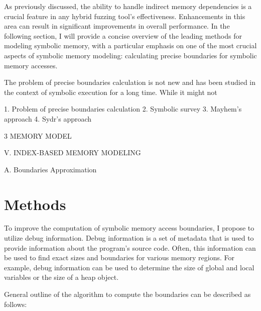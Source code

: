 \documentclass[conference]{IEEEtran}
\begin{document}
As previously discussed, the ability to handle indirect memory dependencies is a crucial feature in any hybrid fuzzing tool's effectiveness. Enhancements in this area can result in significant improvements in overall performance. In the following section, I will provide a concise overview of the leading methods for modeling symbolic memory, with a particular emphasis on one of the most crucial aspects of symbolic memory modeling: calculating precise boundaries for symbolic memory accesses.

The problem of precise boundaries calculation is not new and has been studied in the context of symbolic execution for a long time. While it might not

1. Problem of precise boundaries calculation
2. Symbolic survey
3. Mayhem's approach
4. Sydr's approach

3 MEMORY MODEL \cite{a-survey-of-symbolic-execution-techniques}

V. INDEX-BASED MEMORY MODELING \cite{unleashing-mayhem-on-binary-code}

A. Boundaries Approximation \cite{symbolic-pointers-reasoning}


\section{Methods}

To improve the computation of symbolic memory access boundaries, I propose to utilize debug information. Debug information is a set of metadata that is used to provide information about the program's source code. Often, this information can be used to find exact sizes and boundaries for various memory regions. For example, debug information can be used to determine the size of global and local variables or the size of a heap object.

General outline of the algorithm to compute the boundaries can be described as follows:
\end{document}
